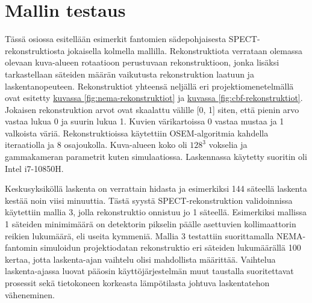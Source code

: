 \section{Mallin testaus}
Tässä osiossa esitellään esimerkit fantomien sädepohjaisesta SPECT-rekonstruktiosta jokaisella kolmella mallilla. Rekonstruktiota verrataan olemassa olevaan kuva-alueen rotaatioon perustuvaan rekonstruktioon, jonka lisäksi tarkastellaan säteiden määrän vaikutusta rekonstruktion laatuun ja laskentanopeuteen. Rekonstruktiot yhteensä neljällä eri projektiomenetelmällä ovat esitetty \hyperref[fig:nema-rekonstruktiot]{kuvassa \ref*{fig:nema-rekonstruktiot}} ja \hyperref[fig:cbf-rekonstruktiot]{kuvassa \ref*{fig:cbf-rekonstruktiot}}. Jokaisen rekonstruktion arvot ovat skaalattu välille [0, 1] siten, että pienin arvo vastaa lukua 0 ja suurin lukua 1. Kuvien värikartoissa 0 vastaa mustaa ja 1 valkoista väriä. Rekonstruktioissa käytettiin OSEM-algoritmia kahdella iteraatiolla ja 8 osajoukolla. Kuva-alueen koko oli $128^3$ vokselia ja gammakameran parametrit kuten simulaatiossa. Laskennassa käytetty suoritin oli Intel i7-10850H.

Keskusyksiköllä laskenta on verrattain hidasta ja esimerkiksi 144 säteellä laskenta kestää noin viisi minuuttia. Tästä syystä SPECT-rekonstruktion validoinnissa käytettiin mallia 3, jolla rekonstruktio onnistuu jo 1 säteellä. Esimerkiksi mallissa 1 säteiden minimimäärä on detektorin pikselin päälle asettuvien kollimaattorin reikien lukumäärä, eli useita kymmeniä. Mallia 3 testattiin suorittamalla NEMA-fantomin simuloidun projektiodatan rekonstruktio eri säteiden lukumäärällä 100 kertaa, jotta laskenta-ajan vaihtelu olisi mahdollista määrittää. Vaihtelua laskenta-ajassa luovat pääosin käyttöjärjestelmän muut taustalla suoritettavat prosessit sekä tietokoneen korkeasta lämpötilasta johtuva laskentatehon väheneminen.

